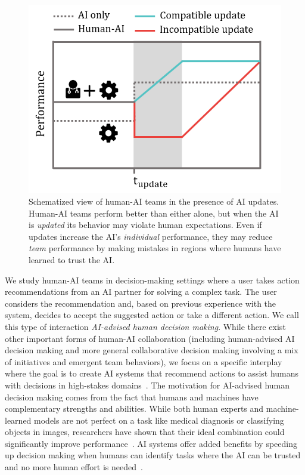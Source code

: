 \documentclass[letterpaper]{article} %
\newcommand{\?}{\mbox{?}}
\begin{document}
\begin{figure}[t]
    \begin{center}
    \includegraphics[width=\linewidth]{Picture1v2.png}
    \end{center}
    \caption{Schematized view of human-AI teams in the presence of AI updates. Human-AI teams perform better than either alone, but when the AI is {\em updated} its behavior may violate human expectations. Even if updates increase the AI's {\em individual} performance, they may reduce {\em team} performance by making mistakes in regions where humans have learned to trust the AI.}
    \label{fig:landing}
\end{figure}

We study human-AI teams in decision-making settings where a user takes action recommendations from an AI partner for solving a complex task. The user considers the recommendation and, based on previous experience with the system, decides to accept the suggested action or take a different action. We call this type of interaction {\em AI-advised human decision making}. While there exist other important forms of human-AI collaboration (including human-advised AI decision making and more general collaborative decision making involving a mix of initiatives and emergent team behaviors), we focus on a specific interplay where the goal is to create AI systems that recommend actions to assist humans with decisions in high-stakes domains~\cite{angwin2016machine,bayati2014data}. The motivation for AI-advised human decision making comes from the fact that humans and machines have complementary strengths and abilities. While both human experts and machine-learned models are not perfect on a task like medical diagnosis or classifying objects in images, researchers have shown that their ideal combination could significantly improve performance~\cite{wang2016deep,kamar2012combining}. 
AI systems offer added benefits by speeding up decision making when humans can identify tasks where the AI can be trusted and no more human effort is needed~\cite{lasecki2012scribe,lasecki2012real}. 
\end{document}
